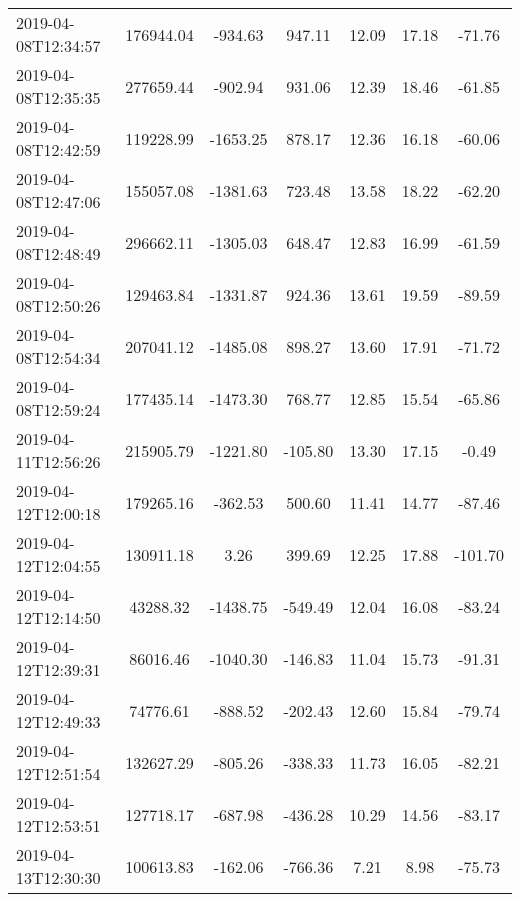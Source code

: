 \begin{table}
\begin{tabular}{lcccccc}
2019-04-08T12:34:57 &  176944.04 &  -934.63 &   947.11 &   12.09 &   17.18 &  -71.76 \\
2019-04-08T12:35:35 &  277659.44 &  -902.94 &   931.06 &   12.39 &   18.46 &  -61.85 \\
2019-04-08T12:42:59 &  119228.99 & -1653.25 &   878.17 &   12.36 &   16.18 &  -60.06 \\
2019-04-08T12:47:06 &  155057.08 & -1381.63 &   723.48 &   13.58 &   18.22 &  -62.20 \\
2019-04-08T12:48:49 &  296662.11 & -1305.03 &   648.47 &   12.83 &   16.99 &  -61.59 \\
2019-04-08T12:50:26 &  129463.84 & -1331.87 &   924.36 &   13.61 &   19.59 &  -89.59 \\
2019-04-08T12:54:34 &  207041.12 & -1485.08 &   898.27 &   13.60 &   17.91 &  -71.72 \\
2019-04-08T12:59:24 &  177435.14 & -1473.30 &   768.77 &   12.85 &   15.54 &  -65.86 \\
2019-04-11T12:56:26 &  215905.79 & -1221.80 &  -105.80 &   13.30 &   17.15 &   -0.49 \\
2019-04-12T12:00:18 &  179265.16 &  -362.53 &   500.60 &   11.41 &   14.77 &  -87.46 \\
2019-04-12T12:04:55 &  130911.18 &     3.26 &   399.69 &   12.25 &   17.88 & -101.70 \\
2019-04-12T12:14:50 &   43288.32 & -1438.75 &  -549.49 &   12.04 &   16.08 &  -83.24 \\
2019-04-12T12:39:31 &   86016.46 & -1040.30 &  -146.83 &   11.04 &   15.73 &  -91.31 \\
2019-04-12T12:49:33 &   74776.61 &  -888.52 &  -202.43 &   12.60 &   15.84 &  -79.74 \\
2019-04-12T12:51:54 &  132627.29 &  -805.26 &  -338.33 &   11.73 &   16.05 &  -82.21 \\
2019-04-12T12:53:51 &  127718.17 &  -687.98 &  -436.28 &   10.29 &   14.56 &  -83.17 \\
2019-04-13T12:30:30 &  100613.83 &  -162.06 &  -766.36 &    7.21 &    8.98 &  -75.73 \\
\bottomrule

\end{tabular}

\end{table}
